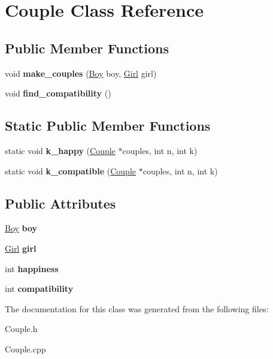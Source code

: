 \hypertarget{class_couple}{}\section{Couple Class Reference}
\label{class_couple}
\subsection*{Public Member Functions}
\begin{DoxyCompactItemize}
\item 
\mbox{\label{class_couple_a1ea5a69da1af9ff8b7a663be1d8ae05c}} 
void {\bfseries make\+\_\+couples} (\hyperlink{class_boy}{Boy} boy, \hyperlink{class_girl}{Girl} girl)
\item 
\mbox{\label{class_couple_afd44c116312fd411df285bde11e24b94}} 
void {\bfseries find\+\_\+compatibility} ()
\end{DoxyCompactItemize}
\subsection*{Static Public Member Functions}
\begin{DoxyCompactItemize}
\item 
\mbox{\label{class_couple_a60b6b151595d937d91d7cf9471996a9a}} 
static void {\bfseries k\+\_\+happy} (\hyperlink{class_couple}{Couple} $\ast$couples, int n, int k)
\item 
\mbox{\label{class_couple_ae93d0b2f169c7e21a3822bbf60fe0f14}} 
static void {\bfseries k\+\_\+compatible} (\hyperlink{class_couple}{Couple} $\ast$couples, int n, int k)
\end{DoxyCompactItemize}
\subsection*{Public Attributes}
\begin{DoxyCompactItemize}
\item 
\mbox{\label{class_couple_a2f4c4e8df15d0a648023a29d48a4dbc8}} 
\hyperlink{class_boy}{Boy} {\bfseries boy}
\item 
\mbox{\label{class_couple_a0e654a04711c8a9e1f53472c9e57cb5a}} 
\hyperlink{class_girl}{Girl} {\bfseries girl}
\item 
\mbox{\label{class_couple_aee78d616688f0cccff84e1c23cb31f7a}} 
int {\bfseries happiness}
\item 
\mbox{\label{class_couple_af47d6ced781259303e10836182abb8c1}} 
int {\bfseries compatibility}
\end{DoxyCompactItemize}


The documentation for this class was generated from the following files\+:\begin{DoxyCompactItemize}
\item 
Couple.\+h\item 
Couple.\+cpp\end{DoxyCompactItemize}
